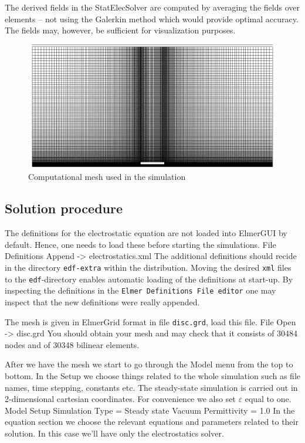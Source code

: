The derived fields in the StatElecSolver are computed 
by averaging the fields over elements -- not using the 
Galerkin method which would provide optimal accuracy. The fields 
may, however, be sufficient for visualization purposes. 



\begin{figure}[h]
\centering
\includegraphics[width=120 mm]{mesh}
\caption{Computational mesh used in the simulation}\label{fg:es_geometry}
\end{figure}  




\subsection*{Solution procedure}

The definitions for the electrostatic equation are not loaded into ElmerGUI by default. Hence, 
one needs to load these before starting the simulations.
\ttbegin
File 
  Definitions
    Append -> electrostatics.xml
\ttend
The additional definitions should recide in the directory \texttt{edf-extra} within the distribution.
Moving the desired \texttt{xml} files to the \texttt{edf}-directory enables automatic loading of the 
definitions at start-up. By inspecting the definitions in the \texttt{Elmer Definitions File editor} one
may inspect that the new definitions were really appended. 


The mesh is given in ElmerGrid format in file \texttt{disc.grd}, load this file.
\ttbegin
File 
  Open -> disc.grd
\ttend
You should obtain your mesh and may check that it consists of 30484 nodes and of 30348 bilinear elements.


After we have the mesh we start to go through the Model menu from the top to bottom. 
In the Setup we choose things related to the whole simulation such as file names, 
time stepping, constants etc.
The steady-state simulation is carried out in 2-dimensional cartesian
coordinates. For convenience we also set $\varepsilon$ equal to one. 
\ttbegin
Model
  Setup 
    Simulation Type = Steady state
    Vacuum Permittivity = 1.0
\ttend
In the equation section we choose the relevant equations and parameters related to their solution. 
In this case we'll have only the electrostatics solver. 


